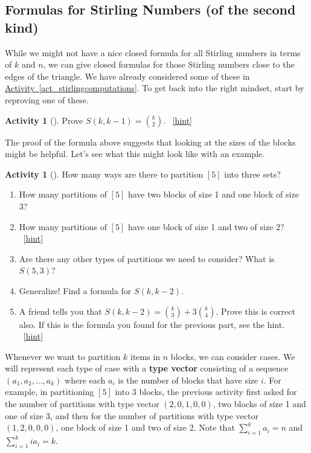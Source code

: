 \documentclass[10pt,]{book}
\newcommand{\terminology}[1]{\textbf{#1}}
\theoremstyle{plain}
\theoremstyle{definition}
\theoremstyle{definition}
\theoremstyle{definition}
\newtheorem{activity}[project]{Activity}
\numberwithin{equation}{chapter}
\begin{document}
\subsection[{Formulas for Stirling Numbers (of the second kind)}]{Formulas for Stirling Numbers (of the second kind)}\label{subsec-stirlingformulas}
\hypertarget{p-1399}{}%
While we might not have a nice closed formula for all Stirling numbers in terms of \(k\) and \(n\), we can give closed formulas for those Stirling numbers close to the edges of the triangle.  We have already considered some of these in \hyperref[act_stirlingcomputations]{Activity~\ref{act_stirlingcomputations}}.  To get back into the right mindset, start by reproving one of these.%
\begin{activity}[]\label{activity-266}
\hypertarget{p-1400}{}%
Prove \(S(k, k-1) = \binom{k}{2}\).%
~\hfill{\tiny\hyperlink{a-273}{[hint]}\hypertarget{q-273}{}}\end{activity}
\hypertarget{p-1403}{}%
The proof of the formula above suggests that looking at the sizes of the blocks might be helpful.  Let's see what this might look like with an example.%
\begin{activity}[]\label{activity-267}
\hypertarget{p-1404}{}%
How many ways are there to partition \([5]\) into three sets?%
\begin{enumerate}[font=\bfseries,label=(\alph*),ref=\alph*]
\item\label{task-256} \hypertarget{p-1405}{}%
How many partitions of \([5]\) have two blocks of size 1 and one block of size 3?%
\item\label{task-257} \hypertarget{p-1406}{}%
How many partitions of \([5]\) have one block of size 1 and two of size 2?%
~\hfill{\tiny\hyperlink{a-274.b}{[hint]}\hypertarget{q-274.b}{}}\item\label{task-258} \hypertarget{p-1408}{}%
Are there any other types of partitions we need to consider?  What is \(S(5,3)\)?%
\item\label{task-259} \hypertarget{p-1409}{}%
Generalize! Find a formula for \(S(k, k-2)\).%
\item\label{task-260} \hypertarget{p-1410}{}%
A friend tells you that \(S(k,k-2) = \binom{k}{3} + 3 \binom{k}{4}\).  Prove this is correct also.  If this is the formula you found for the previous part, see the hint.%
~\hfill{\tiny\hyperlink{a-274.e}{[hint]}\hypertarget{q-274.e}{}}\end{enumerate}
\end{activity}
\hypertarget{p-1412}{}%
 Whenever we want to partition \(k\) items in \(n\) blocks, we can consider cases.  We will represent each type of case with a \terminology{type vector} consisting of a sequence \((a_1, a_2, \ldots, a_k)\) where each \(a_i\) is the number of blocks that have size \(i\).  For example, in partitioning \([5]\) into 3 blocks, the previous activity first asked for the number of partitions with type vector \((2,0,1,0,0)\), two blocks of size 1 and one of size 3, and then for the number of partitions with type vector \((1,2,0,0,0)\), one block of size 1 and two of size 2.  Note that \(\sum_{i=1}^k a_i = n\) and \(\sum_{i=1}^k ia_i = k\).%
\end{document}
